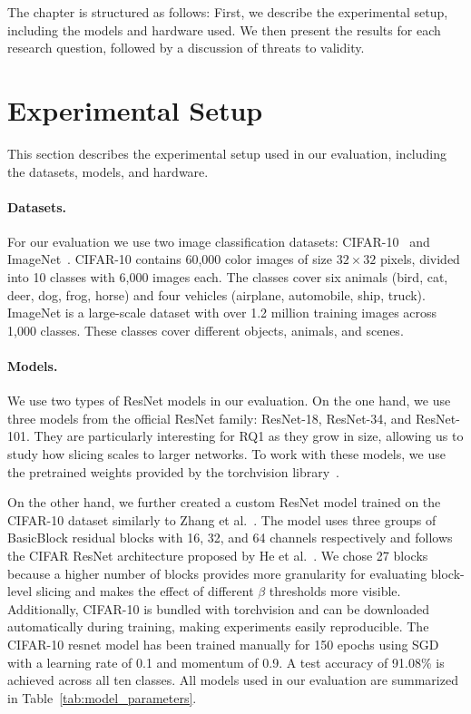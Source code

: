 \documentclass[
12pt,
fancyheadings,
a4paper,
twoside,
BCOR=0.7cm,
nobcorignoretitle,
grayscalebody,
]{stsreprt}
\begin{document}
The chapter is structured as follows: First, we describe the experimental setup, including the
models and hardware used.
We then present the results for each research question, followed by a discussion of threats to
validity.

\section{Experimental Setup}

This section describes the experimental setup used in our evaluation, including the datasets,
models, and hardware.

\paragraph{Datasets.}
For our evaluation we use two image classification datasets: CIFAR-10~\cite{krizhevsky2009learning}
and ImageNet~\cite{deng2009imagenet, russakovsky2015imagenet}.
CIFAR-10 contains 60{,}000 color images of size $32 \times 32$ pixels, divided into 10 classes with
6{,}000 images each.
The classes cover six animals (bird, cat, deer, dog, frog, horse) and four vehicles (airplane,
automobile, ship, truck).
ImageNet is a large-scale dataset with over 1.2 million training images across 1{,}000 classes.
These classes cover different objects, animals, and scenes.


\paragraph{Models.}
We use two types of ResNet models in our evaluation.
On the one hand, we use three models from the official ResNet family: ResNet-18, ResNet-34, and
ResNet-101.
They are particularly interesting for RQ1 as they grow in size, allowing us to study how slicing
scales to larger networks.
To work with these models, we use the pretrained weights provided by the torchvision
library~\cite{paszke2019pytorch}.

On the other hand, we further created a custom ResNet model trained on the CIFAR-10 dataset
similarly to Zhang et al.~\cite{zhang2020dynamic}.
The model uses three groups of BasicBlock residual blocks with 16, 32, and 64 channels respectively
and follows the CIFAR ResNet architecture proposed by He et al.~\cite{he2016deep}. 
We chose 27 blocks because a higher number of blocks provides more granularity for evaluating
block-level slicing and makes the effect of different $\beta$ thresholds more visible.
Additionally, CIFAR-10 is bundled with torchvision and can be downloaded automatically during
training, making experiments easily reproducible.
The CIFAR-10 resnet model has been trained manually for 150 epochs using SGD with a learning rate
of 0.1 and momentum of 0.9.
A test accuracy of 91.08\% is achieved across all ten classes. All models used in our evaluation
are summarized in Table~\ref{tab:model_parameters}.
\end{document}
